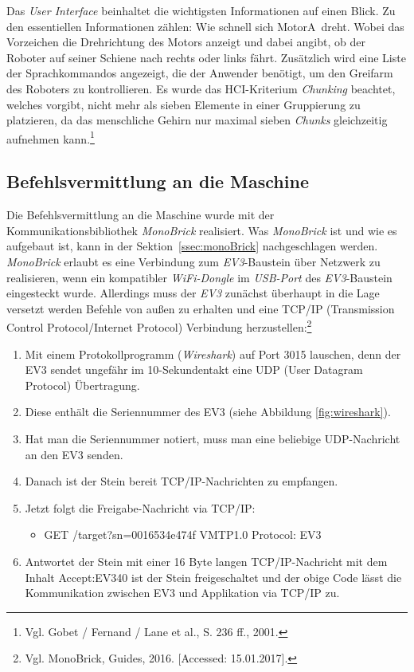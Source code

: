 Das \textit{User Interface} beinhaltet die wichtigsten Informationen auf einen Blick. Zu den essentiellen Informationen zählen: Wie schnell sich \frqq MotorA\flqq\ dreht. Wobei das Vorzeichen die Drehrichtung des Motors anzeigt und dabei angibt, ob der Roboter auf seiner Schiene nach rechts oder links fährt. Zusätzlich wird eine Liste der Sprachkommandos angezeigt, die der Anwender benötigt, um den Greifarm des Roboters zu kontrollieren. Es wurde das HCI-Kriterium \textit{Chunking} beachtet, welches vorgibt, nicht mehr als sieben Elemente in einer Gruppierung zu platzieren, da das menschliche Gehirn nur maximal sieben \textit{Chunks} gleichzeitig aufnehmen kann.\footnote{ Vgl. Gobet / Fernand / Lane et al., S. 236 ff., 2001.}
\subsection{Befehlsvermittlung an die Maschine}\label{ssec:commandMachine}
Die Befehlsvermittlung an die Maschine wurde mit der Kommunikationsbibliothek \textit{MonoBrick} realisiert. Was \textit{MonoBrick} ist und wie es aufgebaut ist, kann in der Sektion~\ref{ssec:monoBrick} nachgeschlagen werden. \textit{MonoBrick} erlaubt es eine Verbindung zum \textit{EV3}-Baustein über Netzwerk zu realisieren, wenn ein kompatibler \textit{WiFi-Dongle} im \textit{USB-Port} des \textit{EV3}-Baustein  eingesteckt wurde. Allerdings muss der \textit{EV3} zunächst überhaupt in die Lage versetzt werden Befehle von außen zu erhalten und eine TCP/IP (Transmission Control Protocol/Internet Protocol) Verbindung herzustellen:\footnote{ Vgl. MonoBrick, Guides, 2016. [Accessed: 15.01.2017].}
\begin{enumerate}
	\item Mit einem Protokollprogramm (\textit{Wireshark}) auf Port 3015 lauschen, denn der EV3 sendet ungefähr im 10-Sekundentakt eine UDP (User Datagram Protocol) Übertragung.
	\item Diese enthält die Seriennummer des EV3 (siehe Abbildung \ref{fig:wireshark}).
	\item Hat man die Seriennummer notiert, muss man eine beliebige UDP-Nachricht an den EV3 senden.
	\item Danach ist der Stein bereit TCP/IP-Nachrichten zu empfangen.
	\item Jetzt folgt die Freigabe-Nachricht via TCP/IP:
	\begin{itemize}
		\item GET /target?sn=0016534e474f VMTP1.0 Protocol: EV3 
	\end{itemize}
	\item Antwortet der Stein mit einer 16 Byte langen TCP/IP-Nachricht mit dem Inhalt Accept:EV340 ist der Stein freigeschaltet und der obige Code lässt die Kommunikation zwischen EV3 und Applikation via TCP/IP zu.
\end{enumerate}
